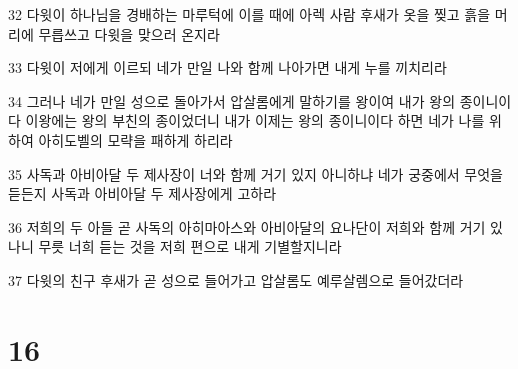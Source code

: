 \par 32 다윗이 하나님을 경배하는 마루턱에 이를 때에 아렉 사람 후새가 옷을 찢고 흙을 머리에 무릅쓰고 다윗을 맞으러 온지라
\par 33 다윗이 저에게 이르되 네가 만일 나와 함께 나아가면 내게 누를 끼치리라
\par 34 그러나 네가 만일 성으로 돌아가서 압살롬에게 말하기를 왕이여 내가 왕의 종이니이다 이왕에는 왕의 부친의 종이었더니 내가 이제는 왕의 종이니이다 하면 네가 나를 위하여 아히도벨의 모략을 패하게 하리라
\par 35 사독과 아비아달 두 제사장이 너와 함께 거기 있지 아니하냐 네가 궁중에서 무엇을 듣든지 사독과 아비아달 두 제사장에게 고하라
\par 36 저희의 두 아들 곧 사독의 아히마아스와 아비아달의 요나단이 저희와 함께 거기 있나니 무릇 너희 듣는 것을 저희 편으로 내게 기별할지니라
\par 37 다윗의 친구 후새가 곧 성으로 들어가고 압살롬도 예루살렘으로 들어갔더라

\chapter{16}

